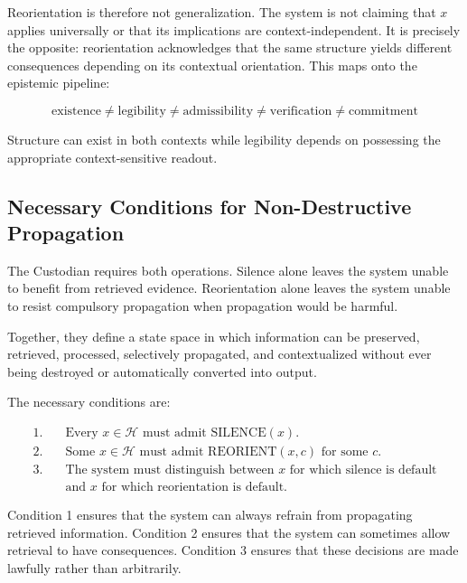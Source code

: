 \documentclass[12pt]{article}
\begin{document}
Reorientation is therefore not generalization. The system is not claiming that $x$ applies universally or that its implications are context-independent. It is precisely the opposite: reorientation acknowledges that the same structure yields different consequences depending on its contextual orientation. This maps onto the epistemic pipeline:

\begin{equation}
\text{existence} \neq \text{legibility} \neq \text{admissibility} \neq \text{verification} \neq \text{commitment}
\end{equation}

Structure can exist in both contexts while legibility depends on possessing the appropriate context-sensitive readout.

\subsection{Necessary Conditions for Non-Destructive Propagation}

The Custodian requires both operations. Silence alone leaves the system unable to benefit from retrieved evidence. Reorientation alone leaves the system unable to resist compulsory propagation when propagation would be harmful.

Together, they define a state space in which information can be preserved, retrieved, processed, selectively propagated, and contextualized without ever being destroyed or automatically converted into output.

The necessary conditions are:

\begin{equation}
\begin{aligned}
1. \quad & \text{Every } x \in \mathcal{H} \text{ must admit } \text{SILENCE}(x). \\
2. \quad & \text{Some } x \in \mathcal{H} \text{ must admit } \text{REORIENT}(x, c) \text{ for some } c. \\
3. \quad & \text{The system must distinguish between } x \text{ for which silence is default} \\
& \text{and } x \text{ for which reorientation is default.}
\end{aligned}
\end{equation}

Condition 1 ensures that the system can always refrain from propagating retrieved information. Condition 2 ensures that the system can sometimes allow retrieval to have consequences. Condition 3 ensures that these decisions are made lawfully rather than arbitrarily.
\end{document}
